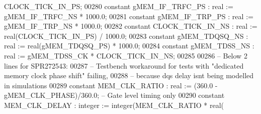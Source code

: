 \begin{DoxyCode}
{      CLOCK_TICK_IN_PS};
00280     \textcolor{keywordflow}{constant} \textcolor{vhdlchar}{gMEM_IF_TRFC_PS}       \textcolor{vhdlchar}{:} \textcolor{comment}{real} \textcolor{vhdlchar}{:=} \textcolor{vhdlchar}{gMEM_IF_TRFC_NS} \textcolor{vhdlchar}{*} \textcolor{vhdllogic}{}\textcolor{vhdllogic}{1000}.\textcolor{vhdllogic}{0};
00281     \textcolor{keywordflow}{constant} \textcolor{vhdlchar}{gMEM_IF_TRP_PS}        \textcolor{vhdlchar}{:} \textcolor{comment}{real} \textcolor{vhdlchar}{:=} \textcolor{vhdlchar}{gMEM_IF_TRP_NS} \textcolor{vhdlchar}{*} \textcolor{vhdllogic}{}\textcolor{vhdllogic}{1000}.\textcolor{vhdllogic}{0};
00282     \textcolor{keywordflow}{constant} \textcolor{vhdlchar}{CLOCK_TICK_IN_NS}      \textcolor{vhdlchar}{:} \textcolor{comment}{real} \textcolor{vhdlchar}{:=} \textcolor{comment}{real}\textcolor{vhdlchar}{(}\textcolor{vhdlchar}{CLOCK_TICK_IN_PS}\textcolor{vhdlchar}{)} \textcolor{vhdlchar}{/} \textcolor{vhdllogic}{}\textcolor{vhdllogic}{1000}.\textcolor{vhdllogic}{0};
00283     \textcolor{keywordflow}{constant} \textcolor{vhdlchar}{gMEM_TDQSQ_NS}         \textcolor{vhdlchar}{:} \textcolor{comment}{real} \textcolor{vhdlchar}{:=} \textcolor{comment}{real}\textcolor{vhdlchar}{(}\textcolor{vhdlchar}{gMEM_TDQSQ_PS}\textcolor{vhdlchar}{)} \textcolor{vhdlchar}{*} \textcolor{vhdllogic}{}\textcolor{vhdllogic}{1000}.\textcolor{vhdllogic}{0};
00284     \textcolor{keywordflow}{constant} \textcolor{vhdlchar}{gMEM_TDSS_NS}      \textcolor{vhdlchar}{:} \textcolor{comment}{real} \textcolor{vhdlchar}{:=} \textcolor{vhdlchar}{gMEM_TDSS_CK} \textcolor{vhdlchar}{*} \textcolor{vhdlchar}{CLOCK_TICK_IN_NS};
00285     
00286 \textcolor{keyword}{    -- Below 2 lines for SPR272543: }
00287 \textcolor{keyword}{    -- Testbench workaround for tests with "dedicated memory clock phase shift" failing, }
00288 \textcolor{keyword}{    -- because dqs delay isnt being modelled in simulations}
00289     \textcolor{keywordflow}{constant} \textcolor{vhdlchar}{MEM_CLK_RATIO}         \textcolor{vhdlchar}{:} \textcolor{comment}{real} \textcolor{vhdlchar}{:=} \textcolor{vhdlchar}{(}\textcolor{vhdllogic}{}\textcolor{vhdllogic}{360}.\textcolor{vhdllogic}{0} \textcolor{vhdlchar}{-} \textcolor{vhdlchar}{gMEM_CLK_PHASE}\textcolor{vhdlchar}{)}\textcolor{vhdlchar}{/}\textcolor{vhdllogic}{}\textcolor{vhdllogic}{360}.\textcolor{vhdllogic}{0};\textcolor{keyword}{            -- Gate level
       timing only}
00290     \textcolor{keywordflow}{constant} \textcolor{vhdlchar}{MEM_CLK_DELAY}         \textcolor{vhdlchar}{:} \textcolor{comment}{integer} \textcolor{vhdlchar}{:=}  \textcolor{comment}{integer}\textcolor{vhdlchar}{(}\textcolor{vhdlchar}{MEM_CLK_RATIO} \textcolor{vhdlchar}{*} \textcolor{comment}{real}\textcolor{vhdlchar}{(}\textcolor{vhdlchar}{
}
\end{DoxyCode}
